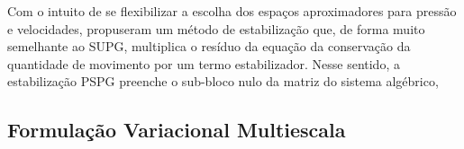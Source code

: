 Com o intuito de se flexibilizar a escolha dos espaços aproximadores para pressão e velocidades,  propuseram um método de estabilização que, de forma muito semelhante ao SUPG, multiplica o resíduo da equação da conservação da quantidade de movimento por um termo estabilizador. Nesse sentido, a estabilização PSPG preenche o sub-bloco nulo da matriz do sistema algébrico,

\subsection{Formulação Variacional Multiescala}




% 

